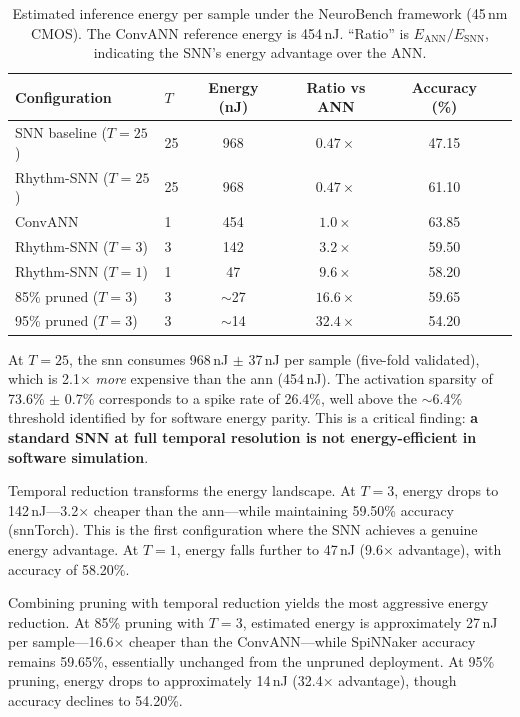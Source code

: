 \begin{table}[t]
\centering
\caption{Estimated inference energy per sample under the NeuroBench framework (45\,nm CMOS). The ConvANN reference energy is 454\,nJ. ``Ratio'' is $E_{\text{ANN}} / E_{\text{SNN}}$, indicating the SNN's energy advantage over the ANN.}
\label{tab:energy}
\small
\begin{tabular}{@{}llcccc@{}}
\toprule
\textbf{Configuration} & \textbf{$T$} & \textbf{Energy (nJ)} & \textbf{Ratio vs ANN} & \textbf{Accuracy (\%)} \\
\midrule
SNN baseline ($T = 25$)     & 25 & 968  & $0.47\times$ & 47.15 \\
Rhythm-SNN ($T = 25$)       & 25 & 968  & $0.47\times$ & 61.10 \\
ConvANN                     & 1  & 454  & $1.0\times$  & 63.85 \\
\midrule
Rhythm-SNN ($T = 3$)        &  3 & 142  & $3.2\times$  & 59.50 \\
Rhythm-SNN ($T = 1$)        &  1 &  47  & $9.6\times$  & 58.20 \\
\midrule
85\% pruned ($T = 3$)       &  3 & $\sim$27 & $16.6\times$ & 59.65 \\
95\% pruned ($T = 3$)       &  3 & $\sim$14 & $32.4\times$ & 54.20 \\
\bottomrule
\end{tabular}
\end{table}

At $T = 25$, the \gls{snn} consumes 968\,nJ $\pm$ 37\,nJ per sample (five-fold validated), which is 2.1$\times$ \emph{more} expensive than the \gls{ann} (454\,nJ). The activation sparsity of 73.6\% $\pm$ 0.7\% corresponds to a spike rate of 26.4\%, well above the $\sim$6.4\% threshold identified by \citet{dampfhoffer2023snns} for software energy parity. This is a critical finding: \textbf{a standard SNN at full temporal resolution is not energy-efficient in software simulation}.

Temporal reduction transforms the energy landscape. At $T = 3$, energy drops to 142\,nJ---3.2$\times$ cheaper than the \gls{ann}---while maintaining 59.50\% accuracy (snnTorch). This is the first configuration where the SNN achieves a genuine energy advantage. At $T = 1$, energy falls further to 47\,nJ (9.6$\times$ advantage), with accuracy of 58.20\%.

Combining pruning with temporal reduction yields the most aggressive energy reduction. At 85\% pruning with $T = 3$, estimated energy is approximately 27\,nJ per sample---16.6$\times$ cheaper than the ConvANN---while SpiNNaker accuracy remains 59.65\%, essentially unchanged from the unpruned deployment. At 95\% pruning, energy drops to approximately 14\,nJ (32.4$\times$ advantage), though accuracy declines to 54.20\%.

